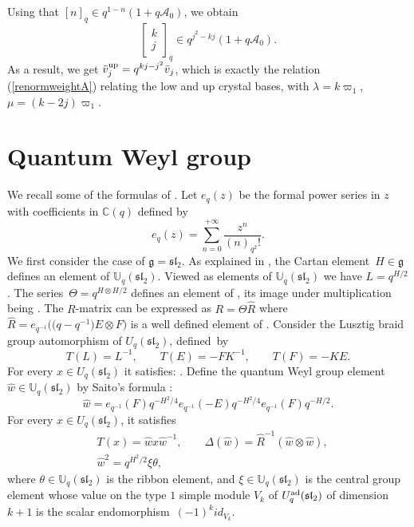 \documentclass[pdftex]{sigma}
\numberwithin{equation}{section}
\theoremstyle{definition}
\newcommand{\Aa}{{\mathcal A}}
\begin{document}
Using that $[n]_q\in q^{1-n}(1+q\Aa_0)$, we obtain
\[\left[\begin{matrix} k\\ j \end{matrix}\right]_{q}\in q^{j^2-kj}(1+ q\Aa_0).\]
As a result, we get $\bar{v}_j^{\rm up}=q^{kj-j^2}\bar{v}_j$, which is exactly the relation (\ref{renormweightA}) relating the low and up crystal bases, with $\lambda=k\varpi_1$, $\mu=(k-2j)\varpi_1$.


\section{Quantum Weyl group}\label{QW}
We recall some of the formulas of \cite{BRT}. Let $e_q(z)$ be the formal power series in $z$ with coefficients in $\mathbb{C}(q)$ defined by
\[
e_q(z)=\sum_{n=0}^{+\infty}\frac{z^n}{(n)_{q^2}!}.
\]
We first consider the case of $\mathfrak{g}= {\mathfrak{sl}_2}$. As explained in \cite[Section 3]{BR}, the Cartan element~${H\in \mathfrak{g}}$ defines an element of ${\mathbb U}_q({\mathfrak{sl}_2})$. Viewed as elements of ${\mathbb U}_q(\mathfrak{sl}_2)$ we have $L\!=\!q^{H/2}$. The series~${\Theta=q^{H\otimes H/2}}$ defines an element of , its image under multiplication being . The $R$-matrix can be expressed as
$R=\Theta \hat{R}$ where $\hat{R}=e_{q^{-1}}\big(\big(q-q^{-1}\big) E\otimes F\big)$ is a well defined element of .
Consider the Lusztig \cite{Lusztig2} braid group automorphism of $U_q({\mathfrak{sl}_2})$, defined~by%
\begin{equation}\label{Tdef}
T(L)=L^{-1},\qquad T(E)=- FK^{-1},\qquad T(F)=-KE.
\end{equation}
For every $x \in U_q({\mathfrak{sl}_2})$ it satisfies: .
Define the quantum Weyl group element $\hat{w}\in {\mathbb U}_q({\mathfrak{sl}_2})$ by Saito's formula \cite{Saito}:
\begin{equation}\label{Saitoform}
\hat{w}=e_{q^{-1}}(F)q^{-H^2/4}e_{q^{-1}}(-E)q^{-H^2/4}e_{q^{-1}}(F)q^{-H/2}.
\end{equation}
For every $x \in U_q({\mathfrak{sl}_2})$, it satisfies
\begin{align}%
&T(x) =\hat{w}x\hat{w}^{-1},\qquad
\Delta(\hat{w}) =\hat{R}^{-1}(\hat{w}\otimes\hat{w}),\label{relTw}\\
 &\hat{w}^2 =q^{H^2/2}\xi \theta,\label{wnorm}
\end{align}
where $\theta\in {\mathbb U}_q({\mathfrak{sl}_2})$ is the ribbon element, and $\xi \in {\mathbb U}_q({\mathfrak{sl}_2})$ is the central group element whose value on the type $1$ simple module $V_k$ of $U_q^{\rm ad}({\mathfrak{sl}_2})$ of dimension $k+1$ is the scalar endomorphism~${(-1)^{k} id_{V_k}}$.
\end{document}
